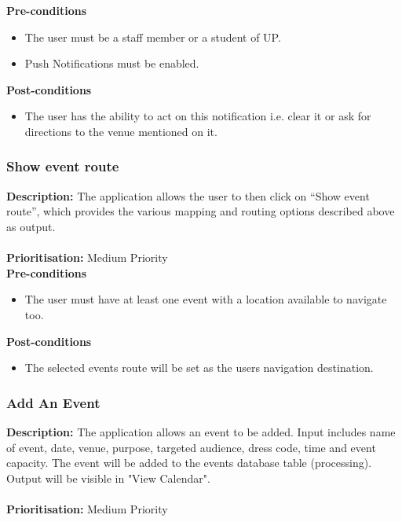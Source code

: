 \documentclass[runningheads,a4paper]{article}
\begin{document}
  
\textbf{Pre-conditions}
\begin{itemize}
	\item The user must be a staff member or a student of UP.
	\item Push Notifications must be enabled.
\end{itemize}
  
\textbf{Post-conditions}
\begin{itemize}
  	\item The user has the ability to act on this notification i.e. clear it or ask for directions to the venue mentioned on it.
\end{itemize}

\subsubsection{Show event route}

\textbf{Description:} The application allows the user to then click on “Show event route”, which provides the various mapping and routing options described above as output.\\\\
\noindent
\textbf{Prioritisation:} Medium Priority\\
  
  
\textbf{Pre-conditions}
\begin{itemize}
	\item The user must have at least one event with a location available to navigate too.
\end{itemize}
  
\textbf{Post-conditions}
\begin{itemize}
  	\item The selected events route will be set as the users navigation destination.
\end{itemize}

\subsubsection{Add An Event}

\textbf{Description:} The application allows an event to be added. Input includes name of event, date, venue, purpose, targeted audience, dress code, time and event capacity. The event will be added to the events database table (processing). Output will be visible in "View Calendar".\\\\
\noindent
\textbf{Prioritisation:} Medium Priority\\
  
\end{document}
